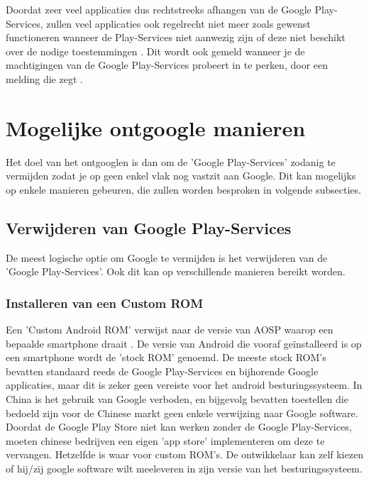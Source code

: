 Doordat zeer veel applicaties dus rechtstreeks afhangen van de Google Play-Services, zullen veel applicaties ook regelrecht niet meer zoals gewenst functioneren wanneer de Play-Services niet aanwezig zijn of deze niet beschikt over de nodige toestemmingen \autocite{marshall_google-play-services}. Dit wordt ook gemeld wanneer je de machtigingen van de Google Play-Services probeert in te perken, door een melding die zegt .

\section{Mogelijke ontgoogle manieren}

Het doel van het ontgooglen is dan om de 'Google Play-Services' zodanig te vermijden zodat je op geen enkel vlak nog vastzit aan Google. Dit kan mogelijks op enkele manieren gebeuren, die zullen worden besproken in volgende subsecties.

\subsection{Verwijderen van Google Play-Services}
De meest logische optie om Google te vermijden is het verwijderen van de 'Google Play-Services'. Ook dit kan op verschillende manieren bereikt worden.

\subsubsection{Installeren van een Custom ROM}
Een 'Custom Android ROM' verwijst naar de versie van AOSP waarop een bepaalde smartphone draait \autocite{custom-rom}. De versie van Android die vooraf geïnstalleerd is op een smartphone wordt de 'stock ROM' genoemd. De meeste stock ROM's bevatten standaard reeds de Google Play-Services en bijhorende Google applicaties, maar dit is zeker geen vereiste voor het android besturingssysteem. In China is het gebruik van Google verboden, en bijgevolg bevatten toestellen die bedoeld zijn voor de Chinese markt geen enkele verwijzing naar Google software. Doordat de Google Play Store niet kan werken zonder de Google Play-Services, moeten chinese bedrijven een eigen 'app store' implementeren om deze te vervangen. Hetzelfde is waar voor custom ROM's. De ontwikkelaar kan zelf kiezen of hij/zij google software wilt meeleveren in zijn versie van het besturingssysteem.

